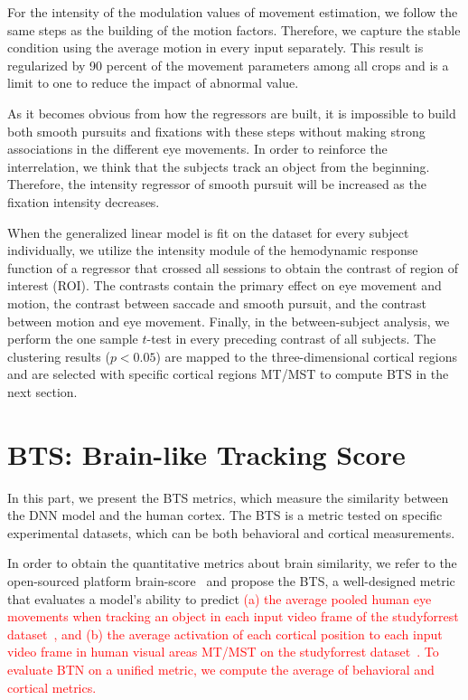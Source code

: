 \documentclass[final,3p,times,twocolumn]{elsarticle}
\begin{document}
For the intensity of the modulation values of movement estimation, we follow the same steps as the building of the motion factors. 
Therefore, we capture the stable condition using the average motion in every input separately. 
This result is regularized by 90 percent of the movement parameters among all crops and is a limit to one to reduce the impact of abnormal value. 

As it becomes obvious from how the regressors are built, it is impossible to build both smooth pursuits and fixations with these steps without making strong associations in the different eye movements. 
In order to reinforce the interrelation, we think that the subjects track an object from the beginning. 
Therefore, the intensity regressor of smooth pursuit will be increased as the fixation intensity decreases. 

When the generalized linear model is fit on the dataset for every subject individually, we utilize the intensity module of the hemodynamic response function of a regressor that crossed all sessions to obtain the contrast of region of interest (ROI). 
The contrasts contain the primary effect on eye movement and motion, the contrast between saccade and smooth pursuit, and the contrast between motion and eye movement. 
Finally, in the between-subject analysis, we perform the one sample $t$-test in every preceding contrast of all subjects. 
The clustering results ($p<0.05$) are mapped to the three-dimensional cortical regions 
and are selected with specific cortical regions MT/MST to compute BTS in the next section. 

\section{BTS: Brain-like Tracking Score} \label{sec:bts}
In this part, we present the BTS metrics, which measure the similarity between the DNN model and the human cortex. 
The BTS is a metric tested on specific experimental datasets, which can be both behavioral and cortical measurements. 

In order to obtain the quantitative metrics about brain similarity, we refer to the open-sourced platform brain-score~\cite{SchrimpfKubilius2018BrainScore} and propose the BTS, a well-designed metric that evaluates a model's ability to predict 
\textcolor{red}{
(a) the average pooled human eye movements when tracking an object in each input video frame of the studyforrest dataset~\cite{gaze_forrest}, 
and (b) the average activation of each cortical position to each input video frame in human visual areas MT/MST on the studyforrest dataset~\cite{gaze_forrest}.
To evaluate BTN on a unified metric, we compute the average of behavioral and cortical metrics.}
\end{document}
